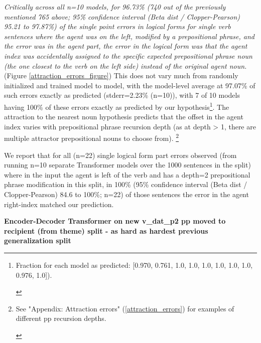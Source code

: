 \documentclass[11pt]{article}
\begin{document}
\textit{Critically across all n=10 \citep{Wu2023} models, for 96.73\% (740 out of the previously mentioned 765 above; 95\% confidence interval (Beta dist / Clopper-Pearson) 95.21 to 97.87\%) of the single point errors in logical forms for single verb sentences where the agent was on the left, modified by a prepositional phrase, and the error was in the agent part, the error in the logical form was that the agent index was accidentally assigned to the specific expected prepositional phrase noun (the one closest to the verb on the left side) instead of the original agent noun.} (Figure \ref{attraction_errors_figure})
This does not vary much from randomly initialized and trained model to model, with the model-level average at 97.07\% of such errors exactly as predicted (stderr=2.23\% (n=10)), with 7 of 10 models having 100\% of these errors exactly as predicted by our hypothesis\footnote{\begin{footnotesize}Fraction for each model as predicted: [0.970, 0.761, 1.0, 
1.0, 1.0, 1.0, 1.0, 1.0, 0.976, 1.0]).
\end{footnotesize}
}.
The attraction to the nearest noun hypothesis predicts that the offset in the agent index varies with prepositional phrase recursion depth (as at depth > 1, there are multiple attractor prepositional nouns to choose from).
\footnote{\begin{footnotesize}See "Appendix: Attraction errors" (\ref{attraction_errors}) for examples of different pp recursion depths.
\end{footnotesize}
}

We report that for all (n=22) single logical form part errors observed (from running n=10 separate Transformer models over the 1000 sentences in the split) where in the input the agent is left of the verb and has a depth=2 prepositional phrase modification in this split, in 100\% (95\% confidence interval (Beta dist / Clopper-Pearson) 84.6 to 100\%; n=22) of those sentences the error in the agent right-index matched our prediction.\label{error_analysis_for_baseline_transformer_predict_and_confirm_attraction_errors}

\textbf{\citep{Wu2023} Encoder-Decoder Transformer on new v\_dat\_p2 pp moved to recipient (from theme) split - as hard as hardest previous generalization split}
\end{document}
